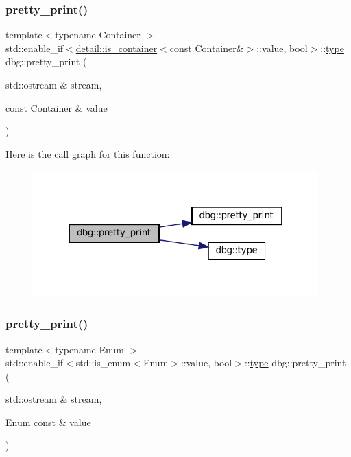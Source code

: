 \subsubsection{\texorpdfstring{pretty\+\_\+print()}{pretty\_print()}\hspace{0.1cm}{\footnotesize\ttfamily [16/19]}}
{\footnotesize\ttfamily template$<$typename Container $>$ \\
std\+::enable\+\_\+if$<$\hyperlink{structdbg_1_1detail_1_1is__container}{detail\+::is\+\_\+container}$<$const Container\&$>$\+::value, bool$>$\+::\hyperlink{namespacedbg_a2365d80e3a3525e6025040383ff8661b}{type} dbg\+::pretty\+\_\+print (\begin{DoxyParamCaption}\item[{std\+::ostream \&}]{stream,  }\item[{const Container \&}]{value }\end{DoxyParamCaption})\hspace{0.3cm}{\ttfamily [inline]}}

Here is the call graph for this function\+:
\nopagebreak
\begin{figure}[H]
\begin{center}
\leavevmode
\includegraphics[width=312pt]{namespacedbg_a1212dc990d58f20efcf5d66eb4a5781c_cgraph}
\end{center}
\end{figure}
\mbox{\label{namespacedbg_acd3034b7476cdf474e46eb2bbca6e0d1}} 
\subsubsection{\texorpdfstring{pretty\+\_\+print()}{pretty\_print()}\hspace{0.1cm}{\footnotesize\ttfamily [17/19]}}
{\footnotesize\ttfamily template$<$typename Enum $>$ \\
std\+::enable\+\_\+if$<$std\+::is\+\_\+enum$<$Enum$>$\+::value, bool$>$\+::\hyperlink{namespacedbg_a2365d80e3a3525e6025040383ff8661b}{type} dbg\+::pretty\+\_\+print (\begin{DoxyParamCaption}\item[{std\+::ostream \&}]{stream,  }\item[{Enum const \&}]{value }\end{DoxyParamCaption})\hspace{0.3cm}{\ttfamily [inline]}}

